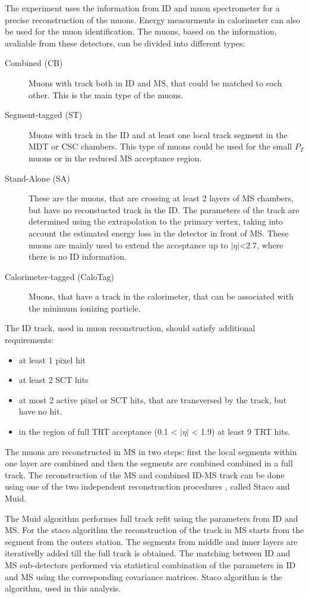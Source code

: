 The \atlas experiment uses the information from ID and muon spectrometer  for a precise reconstruction of the muons. Energy measurments in calorimeter can also be used for the muon identification. The muons, based on the information, avaliable from these detectors, can be divided into different types:
\begin{description}
\item[Combined (CB)] Muons with track both in ID and MS, that could be matched to each other. This is the main type of the muons.
\item[Segment-tagged (ST)] Muons with track in the ID and at least one local track segment in the MDT or CSC chambers. This type of muons could be used for the small $P_{T}$ muons or in the reduced MS acceptance region.
\item[Stand-Alone (SA)] These are the muons, that are crossing at least 2 layers of MS chambers, but have no reconstucted track in the ID. The parameters of the track are determined using the extrapolation to the primary vertex, taking into account the estimated energy loss in the detector in front of MS. These muons are mainly used to extend the acceptance up to $|\eta|$<2.7, where there is no ID information.
\item[Calorimeter-tagged (CaloTag)]  Muons, that have a track in the calorimeter, that can be associated with the minimum ionizing particle.
\end{description}

The ID track, used in muon reconstruction, should satisfy additional requirements:
\begin{itemize}
\item  at least 1 pixel hit
\item at least 2 SCT hits
\item at most 2 active pixel or SCT hits, that are transversed by the track, but have no hit.
\item in the region of full TRT acceptance (0.1 < $|\eta|$ < 1.9) at least 9 TRT hits.
\end{itemize}

The muons are reconstructed in MS in two steps: first the local segments within one layer are combined and then the segments are combined combined in a full track. The reconstruction of the MS and combined ID-MS track can be done using one of the two independent reconstruction procedures \cite{AtlasPerf}, called Staco and Muid.  

The Muid algorithm performes full track refit using the parameters from ID and MS\cite{Muid}. 
For the staco algorithm the reconstruction of the track in MS starts from the segment from the outers station. The segments from middle and  inner layers are iterativelly added till the full track is obtained. The matching between ID and MS sub-detectors performed via statistical combination of the parameters in ID and MS using the corresponding covariance matrices\cite{Staco}. Staco algorithm is the algorithm, used in this analysis. 

